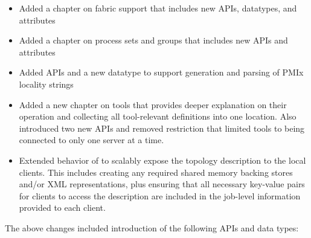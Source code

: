\begin{itemize}
    \item Added a chapter on fabric support that includes new \acp{API}, datatypes, and attributes
    \item Added a chapter on process sets and groups that includes new \acp{API} and attributes
    \item Added \acp{API} and a new datatype to support generation and parsing of \ac{PMIx} locality strings
    \item Added a new chapter on tools that provides deeper explanation on their operation and collecting all tool-relevant definitions into one location. Also introduced two new \acp{API} and removed restriction that limited tools to being connected to only one server at a time.
    \item Extended behavior of  to scalably expose the topology description to the local clients. This includes creating any required shared memory backing stores and/or \ac{XML} representations, plus ensuring that all necessary key-value pairs for clients to access the description are included in the job-level information provided to each client.
\end{itemize}

The above changes included introduction of the following \acp{API} and data types:

